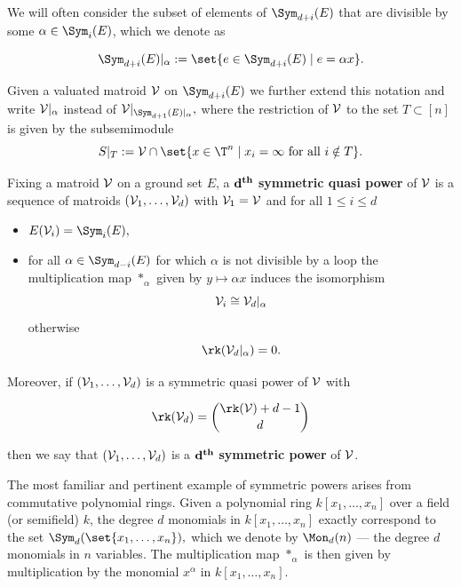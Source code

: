 We will often consider the subset of elements of $\Sym_{d+i}(E)$ that are divisible by some $\alpha\in \Sym_{i}(E)$, which we denote as

$$\Sym_{d+i}(E)|_{\alpha} := \set{e\in \Sym_{d+i}(E)\mid e= \alpha x}.$$

Given a valuated matroid $\mathcal{V}$ on $\Sym_{d+i}(E)$ we further extend this notation and write $\mathcal{V}|_{\alpha}$ instead of $\sV|_{\Sym_{d+1}(E)|_{\alpha}},$ where the restriction of $\mathcal{V}$ to the set $T\subset [n]$ is given by the subsemimodule 
$$S|_T:=\sV\cap \set{x\in \T^n \mid x_i=\infty \text{ for all } i\notin T}.$$

\begin{definition}\label{def:symprod}
Fixing a matroid $\mathcal{V}$ on a ground set $E$, a $\mathbf{d}^{\text{\textbf{th}}}$ \textbf{symmetric quasi power} of $\mathcal{V}$ is a sequence of matroids $(\mathcal{V}_1,\dots,\mathcal{V}_d)$ with $\mathcal{V}_1 = \mathcal{V}$ and for all $1\leq i \leq d$
\begin{itemize}
    \item $E(\sV_i) = \Sym_i(E),$
    \item for all $\alpha\in \Sym_{d-i}(E)$ for which $\alpha$ is not divisible by a loop the multiplication map $*_\alpha$ given by $y\mapsto \alpha x$ induces the isomorphism
    \begin{equation}\label{eqn:symprodEmbedding} 
        \mathcal{V}_i\cong \mathcal{V}_d|_{\alpha}
    \end{equation}
    otherwise
    \begin{equation}\label{eqn:symprodLoops}
        \rk(\sV_d|_{\alpha})=0.
    \end{equation}
    
\end{itemize} 
Moreover, if $(\mathcal{V}_1,\dots,\mathcal{V}_d)$ is a symmetric quasi power of $\mathcal{V}$ with

\begin{equation}\label{eqn:symprodRank}
\rk(\sV_d)= \binom{\rk(\sV)+d-1}{d}
\end{equation}

then we say that $(\mathcal{V}_1,\dots,\mathcal{V}_d)$ is a $\mathbf{d}^{\text{\textbf{th}}}$ \textbf{symmetric power} of $\mathcal{V}$.
\end{definition}

The most familiar and pertinent example of symmetric powers arises from commutative polynomial rings. Given a polynomial ring $k[x_1,\dots,x_n]$ over a field (or semifield) $k$, the degree $d$ monomials in $k[x_1,\dots,x_n]$ exactly correspond to the set $\Sym_d(\set{x_1,\dots,x_n}),$ which we denote by $\Mon_d(n)$ --- the degree $d$ monomials in $n$ variables. The multiplication map $*_\alpha$ is then given by multiplication by the monomial $x^\alpha$ in $k[x_1,\dots,x_n]$.

